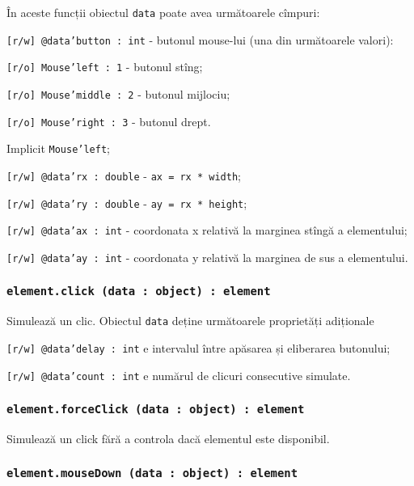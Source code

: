În aceste funcții obiectul \texttt{data} poate avea următoarele cîmpuri:
\begin{icItems}
    \item \texttt{[r/w] @data'button : int} - butonul mouse-lui (una din următoarele valori):
	\begin{icItems}
	    \item \texttt{[r/o] Mouse'left : 1} - butonul stîng;
		\item \texttt{[r/o] Mouse'middle : 2} - butonul mijlociu;
		\item \texttt{[r/o] Mouse'right : 3} - butonul drept.
	\end{icItems}
	Implicit \texttt{Mouse'left};
	\item \texttt{[r/w] @data'rx : double} - \texttt{ax = rx * width};
	\item \texttt{[r/w] @data'ry : double} - \texttt{ay = rx * height};
	\item \texttt{[r/w] @data'ax : int} - coordonata x relativă la marginea stîngă a elementului;
	\item \texttt{[r/w] @data'ay : int} - coordonata y relativă la marginea de sus a elementului.
\end{icItems}

\subsubsection{\texttt{element.click (data : object) : element}}

Simulează un clic. Obiectul \texttt{data} deține următoarele proprietăți adiționale
\begin{icItems}
	\item \texttt{[r/w] @data'delay : int} e intervalul între apăsarea și eliberarea butonului;
	\item \texttt{[r/w] @data'count : int} e numărul de clicuri consecutive simulate.
\end{icItems}

\subsubsection{\texttt{element.forceClick (data : object) : element}}

Simulează un click fără a controla dacă elementul este disponibil.

\subsubsection{\texttt{element.mouseDown (data : object) : element}}

